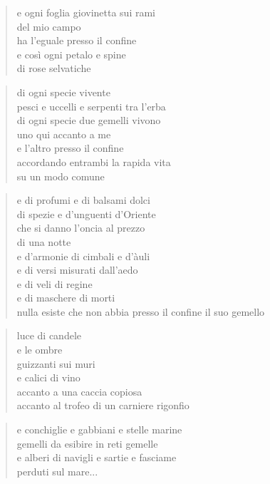 	\begin{verse}
		e ogni foglia giovinetta sui rami\\
		del mio campo\\
		ha l’eguale presso il confine\\
		e così ogni petalo e spine\\
		di rose selvatiche
	\end{verse}

	\begin{verse}
		di ogni specie vivente\\
		pesci e uccelli e serpenti tra l’erba\\
		di ogni specie due gemelli vivono\\
		uno qui accanto a me\\
		e l’altro presso il confine\\
		accordando entrambi la rapida vita\\
		su un modo comune
	\end{verse}

	\begin{verse}
		e di profumi e di balsami dolci\\
		di spezie e d’unguenti d’Oriente\\
		che si danno l’oncia al prezzo\\
		di una notte\\
		e d’armonie di cimbali e d’àuli\\
		e di versi misurati dall’aedo\\
		e di veli di regine\\
		e di maschere di morti\\
		nulla esiste che non abbia
		presso il confine il suo gemello
	\end{verse}

	\begin{verse}
		luce di candele\\
		e le ombre\\
		guizzanti sui muri\\
		e calici di vino\\
		accanto a una caccia copiosa\\
		accanto al trofeo di un carniere rigonfio
	\end{verse}

	\begin{verse}
		e conchiglie e gabbiani e stelle marine\\
		gemelli da esibire in reti gemelle\\
		e alberi di navigli e sartie e fasciame\\
		perduti sul mare...
	\end{verse}

